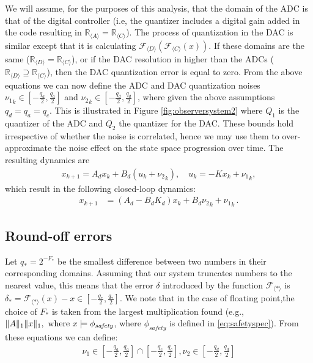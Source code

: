 \documentclass[sigconf]{llncs}
\DeclarePairedDelimiter\norm{\lVert}{\rVert}
\newcommand{\mat}[1]{{#1}}
\renewcommand{\vec}[1]{{#1}}
\begin{document}
We will assume, for the purposes of this analysis, that the domain of the
ADC is that of the digital controller (i.e, the quantizer includes a digital
gain added in the code resulting in $\mathbb{R}_{\langle A \rangle}=\mathbb{R}_{\langle C \rangle}$).
The process of quantization in the DAC is
similar except that it is calculating $\mathcal{F}_{\langle D\rangle}
(\mathcal{F}_{\langle C \rangle} (x)) $.  If these domains
are the same ($\mathbb{R}_{\langle D \rangle}=\mathbb{R}_{\langle C \rangle}$), or if the DAC
resolution in higher than the ADCs ($\mathbb{R}_{\langle D \rangle}\supseteq\mathbb{R}_{\langle C \rangle}$), then the DAC quantization error is equal
to zero.  From the above equations we can now define the ADC and DAC
quantization noises ${\nu_1}_k \in [-\frac{q_a}{2}, \frac{q_a}{2}]$ and
${\nu_2}_k \in [-\frac{q_d}{2}, \frac{q_d}{2}]$, where given the above assumptions $q_d=q_a=q_c$. 
This is illustrated in Figure \ref{fig:observersystem2} where $Q_1$ is the quantizer of the ADC
and $Q_2$ the quantizer for the DAC.  These bounds hold irrespective of
whether the noise is correlated, hence we may use them to over-approximate
the noise effect on the state space progression over time.  The
resulting dynamics are
%
\begin{align*}
\vec{x}_{k+1} = \mat{A}_d\vec{x}_k+\mat{B}_d({u}_k+{{\nu}_2}_k), \quad u_k = -\mat{K}\vec{x}_{k}+{{\nu}_1}_k, 
\end{align*}
%
which result in the following closed-loop dynamics:
%
\begin{align*}
\vec{x}_{k+1} &= (\mat{A}_d-\mat{B}_d\mat{K}_d) \vec{x}_k+\mat{B}_d{{\nu}_2}_k +{{\nu}_1}_k \,. 
\end{align*}

\subsection{Round-off errors}
\label{sec:roundoff-noise}

Let $q_*=2^{-F_*}$ be the smallest difference
between two numbers in their corresponding domains.  Assuming that our
system truncates numbers to the nearest value, this means that the error
$\delta$ introduced by the function $\mathcal{F}_{\langle * \rangle}$ is
$\delta_*=\mathcal{F}_{\langle * \rangle}(x)-x \in \left[-\frac{q_*}{2}, 
\frac{q_*}{2}\right]$.
We note that in the case of floating point,the
choice of $F_*$ is taken from the largest multiplication found (e.g.,
$\norm{\mat{A}}_1\norm{\vec{x}}_1, \text{ where }  \vec{x} \models \phi_\mathit{safety}$,
where $\phi_\mathit{safety}$ is defined in \ref{eq:safetyspec}). From these
equations we can define:
%
\begin{align*}
\nu_1 \in \left[-\frac{q_a}{2}, \frac{q_a}{2}\right] \cap  \left[-\frac{q_c}{2}, \frac{q_c}{2}\right],
\nu_2 \in \left[-\frac{q_d}{2}, \frac{q_d}{2}\right]
\end{align*}
\end{document}
